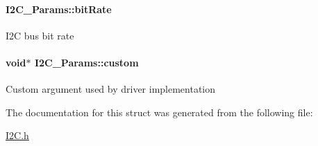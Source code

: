 \paragraph[{bit\-Rate}]{ I2\-C\-\_\-\-Params\-::bit\-Rate}\label{struct_i2_c___params_ad31857f6dbedb77c60c92cc8cd8cde0c}
I2\-C bus bit rate 
\paragraph[{custom}]{\setlength{\rightskip}{0pt plus 5cm}void$\ast$ I2\-C\-\_\-\-Params\-::custom}\label{struct_i2_c___params_a2416cc06d853e6cc24e1f294dfebb194}
Custom argument used by driver implementation 

The documentation for this struct was generated from the following file\-:\begin{DoxyCompactItemize}
\item 
\hyperlink{_i2_c_8h}{I2\-C.\-h}\end{DoxyCompactItemize}
